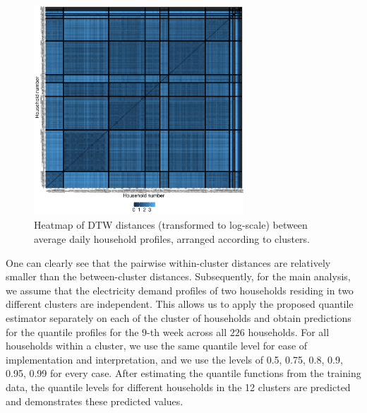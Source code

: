\documentclass[aos]{imsart}
\theoremstyle{plain}
\theoremstyle{remark}
\begin{document}
\begin{figure}[!ht]
    \centering
    \includegraphics[width = 0.7\textwidth]{heatmap.pdf}
    \caption{Heatmap of DTW distances (transformed to log-scale) between average daily household profiles, arranged according to clusters.}
    \label{fig:heatplot-log}
\end{figure}

One can clearly see that the pairwise within-cluster distances are relatively smaller than the between-cluster distances. Subsequently, for the main analysis, we assume that the electricity demand profiles of two households residing in two different clusters are independent. This allows us to apply the proposed quantile estimator separately on each of the cluster of households and obtain predictions for the quantile profiles for the $9$-th week across all $226$ households. For all households within a cluster, we use the same quantile level for ease of implementation and interpretation, and we use the levels of 0.5, 0.75, 0.8, 0.9, 0.95, 0.99 for every case. After estimating the quantile functions from the training data, the quantile levels for different households in the 12 clusters are predicted and  demonstrates these predicted values.
\end{document}
